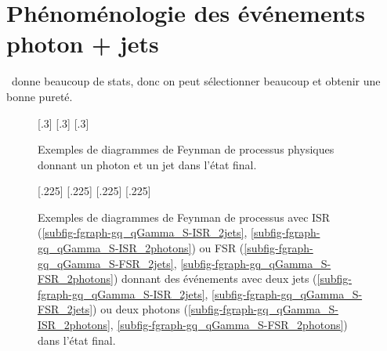 \section{Phénoménologie des événements photon + jets}\label{chapter-JERC-section-pheno-GJets}
\Gjet\ donne beaucoup de stats, donc on peut sélectionner beaucoup et obtenir une bonne pureté.
\begin{figure}[h]
\centering\vspace{\baselineskip}
\subcaptionbox{\label{subfig-fgraph-gq_qGamma_S}}[.3\textwidth]
{\vspace{\baselineskip}}
\hfill
\subcaptionbox{\label{subfig-fgraph-gq_qGamma_T}}[.3\textwidth]
{\vspace{\baselineskip}}
\hfill
\subcaptionbox{\label{subfig-fgraph-qq_gGamma}}[.3\textwidth]
{\vspace{\baselineskip}}
\caption[Diagrammes de Feynman donnant un photon et un jet dans l'état final.]{Exemples de diagrammes de Feynman de processus physiques donnant un photon et un jet dans l'état final.}
\label{fig-fgraph-gamma_plus_jets}
\end{figure}

\begin{figure}[h]
\centering\vspace{\baselineskip}
\subcaptionbox{\label{subfig-fgraph-gq_qGamma_S-ISR_2jets}}[.225\textwidth]
{\vspace{\baselineskip}}
\hfill
\subcaptionbox{\label{subfig-fgraph-gq_qGamma_S-ISR_2photons}}[.225\textwidth]
{\vspace{\baselineskip}}
\hfill
\subcaptionbox{\label{subfig-fgraph-gq_qGamma_S-FSR_2jets}}[.225\textwidth]
{\vspace{\baselineskip}}
\hfill
\subcaptionbox{\label{subfig-fgraph-gq_qGamma_S-FSR_2photons}}[.225\textwidth]
{\vspace{\baselineskip}}
\caption[Diagrammes de Feynman de processus avec ISR ou FSR.]{Exemples de diagrammes de Feynman de processus avec ISR (\ref{subfig-fgraph-gq_qGamma_S-ISR_2jets}, \ref{subfig-fgraph-gq_qGamma_S-ISR_2photons}) ou FSR (\ref{subfig-fgraph-gq_qGamma_S-FSR_2jets}, \ref{subfig-fgraph-gq_qGamma_S-FSR_2photons}) donnant des événements avec deux jets (\ref{subfig-fgraph-gq_qGamma_S-ISR_2jets}, \ref{subfig-fgraph-gq_qGamma_S-FSR_2jets}) ou deux photons (\ref{subfig-fgraph-gq_qGamma_S-ISR_2photons}, \ref{subfig-fgraph-gq_qGamma_S-FSR_2photons}) dans l'état final.}
\label{fig-fgraph-gamma_plus_jets-ISR-FSR}
\end{figure}

